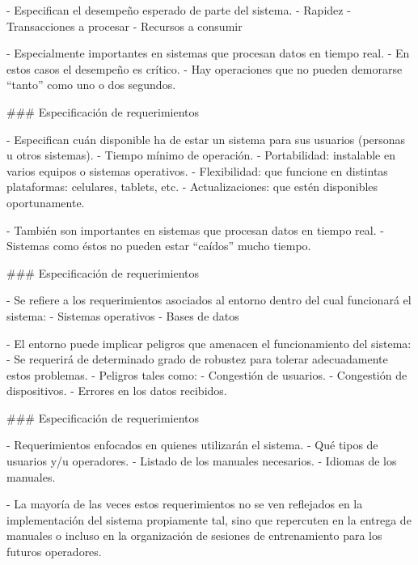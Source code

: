 \newline

- Especifican el desempeño esperado de parte del sistema.
    - Rapidez
    - Transacciones a procesar
    - Recursos a consumir

- Especialmente importantes en sistemas que procesan datos en tiempo real.
    - En estos casos el desempeño es crítico.
    - Hay operaciones que no pueden demorarse ``tanto'' como uno o dos segundos.

### Especificación de requerimientos

\newline

- Especifican cuán disponible ha de estar un sistema para sus usuarios (personas u
otros sistemas).
    - Tiempo mínimo de operación.
    - Portabilidad: instalable en varios equipos o sistemas operativos.
    - Flexibilidad: que funcione en distintas plataformas: celulares, tablets, etc.
    - Actualizaciones: que estén disponibles oportunamente.

- También son importantes en sistemas que procesan datos en tiempo real.
    - Sistemas como éstos no pueden estar ``caídos'' mucho tiempo.

### Especificación de requerimientos

\newline

- Se refiere a los requerimientos asociados al entorno dentro del cual funcionará el sistema:
    - Sistemas operativos
    - Bases de datos

- El entorno puede implicar peligros que amenacen el funcionamiento del sistema:
    - Se requerirá de determinado grado de robustez para tolerar adecuadamente estos problemas.
    - Peligros tales como:
        - Congestión de usuarios.
        - Congestión de dispositivos.
        - Errores en los datos recibidos.

### Especificación de requerimientos

\newline

- Requerimientos enfocados en quienes utilizarán el sistema.
    - Qué tipos de usuarios y/u operadores.
    - Listado de los manuales necesarios.
    - Idiomas de los manuales.

- La mayoría de las veces estos requerimientos no se ven reflejados en la implementación
del sistema propiamente tal, sino que repercuten en la entrega de manuales o incluso en
la organización de sesiones de entrenamiento para los futuros operadores.

